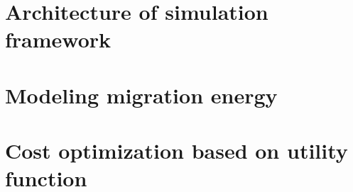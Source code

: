 



\section{Architecture of simulation framework} \label{sec:architecture_of_simulation_framework}

\section{Modeling migration energy}

\section{Cost optimization based on utility function}


